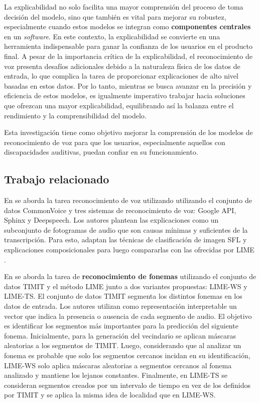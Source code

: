 \documentclass[conference]{IEEEtran}
\begin{document}
La explicabilidad no solo facilita una mayor comprensión del proceso de toma decisión del modelo, sino que también es vital para mejorar su robustez, especialmente cuando estos modelos se integran como \textbf{componentes centrales} en un \textit{software}. En este contexto, la explicabilidad se convierte en una herramienta indispensable para ganar la confianza de los usuarios en el producto final. A pesar de la importancia crítica de la explicabilidad, el reconocimiento de voz presenta desafíos adicionales debido a la naturaleza física de los datos de entrada, lo que complica la tarea de proporcionar explicaciones de alto nivel basadas en estos datos. Por lo tanto, mientras se busca avanzar en la precisión y eficiencia de estos modelos, es igualmente imperativo trabajar hacia soluciones que ofrezcan una mayor explicabilidad, equilibrando así la balanza entre el rendimiento y la comprensibilidad del modelo. 

Esta investigación tiene como objetivo mejorar la comprensión de los modelos de reconocimiento de voz para que los usuarios, especialmente aquellos con discapacidades auditivas, puedan confiar en su funcionamiento.

\subsection{Trabajo relacionado}

En \cite{10094635} se aborda la tarea reconocimiento de voz utilizando utilizando el conjunto de datos CommonVoice \cite{commonvoice:2020} y tres sistemas de reconocimiento de voz: Google API, Sphinx y Deepspeech. Los autores plantean las explicaciones como un subconjunto de fotogramas de audio que son causas mínimas y suficientes de la transcripción. Para esto, adaptan las técnicas de clasificación de imagen SFL \cite{sun2020explaining} y explicaciones composicionales \cite{unknown} para luego compararlas con las ofrecidas por LIME \cite{ribeiro2016why}.

En \cite{wu2023trust} se aborda la tarea de \textbf{reconocimiento de fonemas} utilizando el conjunto de datos TIMIT \cite{timit} y el método LIME junto a dos variantes propuestas: LIME-WS y LIME-TS. El conjunto de datos TIMIT segmenta los distintos fonemas en los datos de entrada. Los autores utilizan como representación interpretable un vector que indica la presencia o ausencia de cada segmento de audio. El objetivo es identificar los segmentos más importantes para la predicción del siguiente fonema. Inicialmente, para la generación del vecindario se aplican máscaras aleatorias a los segmentos de TIMIT. Luego, considerando que al analizar un fonema es probable que solo los segmentos cercanos incidan en su identificación, LIME-WS solo aplica máscaras aleatorias a segmentos cercanos al fonema analizado y mantiene los lejanos constantes. Finalmente, en LIME-TS se consideran segmentos creados por un intervalo de tiempo en vez de los definidos por TIMIT y se aplica la misma idea de localidad que en LIME-WS.
\end{document}
